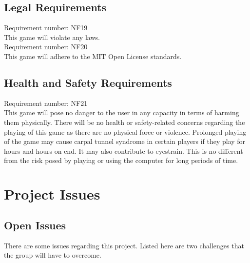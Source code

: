 \documentclass[12pt, titlepage]{article}
\begin{document}
\subsection{Legal Requirements}
Requirement number: NF19
\\This game will violate any laws.
\smallskip
\\Requirement number: NF20
\\This game will adhere to the MIT Open License standards.

\subsection{Health and Safety Requirements}
Requirement number: NF21
\\This game will pose no danger to the user in any capacity in terms of harming them physically. There will be no health or safety-related concerns regarding the playing of this game as there are no physical force or violence. Prolonged playing of the game may cause carpal tunnel syndrome in certain players if they play for hours and hours on end. It may also contribute to eyestrain. This is no different from the risk posed by playing or using the computer for long periods of time. 

\newpage

\section{Project Issues}

\subsection{Open Issues}
There are some issues regarding this project. Listed here are two challenges that the group will have to overcome.
\end{document}
